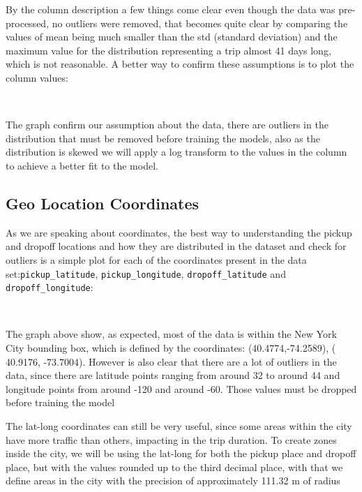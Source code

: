 \documentclass[11pt]{article}
\begin{document}
By the column description a few things come clear even though the data was pre-processed, no outliers were removed, that becomes quite clear by comparing the values of mean being much smaller than the std (standard deviation) and the maximum value for the distribution representing a trip almost 41 days long, which is not reasonable. A better way to confirm these assumptions is to plot the column values:

    \begin{center}
    \end{center}
    { \hspace*{\fill} \\}
    
The graph confirm our assumption about the data, there are outliers in the distribution that must be removed before training the models, also as the distribution is skewed we will apply a log transform to the values in the column to achieve a better fit to the model.
\subsection{Geo Location Coordinates}

As we are speaking about coordinates, the best way to understanding the pickup and dropoff locations and how they are distributed in the dataset and check for outliers is a simple plot for each of the coordinates present in the data set:\texttt{pickup\_latitude}, \texttt{pickup\_longitude}, \texttt{dropoff\_latitude} and \texttt{dropoff\_longitude}:

    \begin{center}
    \end{center}
    { \hspace*{\fill} \\}
    
The graph above show, as expected, most of the data is within the New York City bounding box, which is defined by the coordinates: (40.4774,-74.2589), ( 40.9176, -73.7004). However is also clear that there are a lot of outliers in the data, since there are latitude points ranging from around 32 to around 44 and longitude points from around -120 and around -60. Those values must be dropped before training the model

The lat-long coordinates can still be very useful, since some areas within the city have more traffic than others, impacting in the trip duration. To create zones inside the city, we will be using the lat-long for both the pickup place and dropoff place, but with the values rounded up to the third decimal place, with that we define areas in the city with the precision of approximately 111.32 m of radius \cite{lat_long_round_radius}
    
\end{document}
